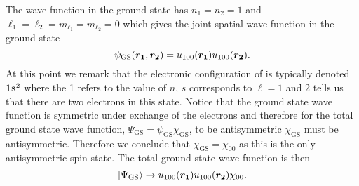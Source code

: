     The wave function in the ground state has \(n_1 = n_2 = 1\) and \(\ell_1 = \ell_2 = m_{\ell_1} = m_{\ell_2} = 0\) which gives the joint spatial wave function in the ground state
    \[\psi_{\mathrm{GS}}(\bm{r_1}, \bm{r_2}) = u_{100}(\bm{r_1})u_{100}(\bm{r_2}).\]
    At this point we remark that the electronic configuration of  is typically denoted \(\termNotation[1]{}{\mathrm{s}}{}^2\) where the 1 refers to the value of \(n\), \(s\) corresponds to \(\ell = 1\) and \(2\) tells us that there are two electrons in this state.
    Notice that the ground state wave function is symmetric under exchange of the electrons and therefore for the total ground state wave function, \(\Psi_{\mathrm{GS}} = \psi_{\mathrm{GS}}\chi_{\mathrm{GS}}\), to be antisymmetric \(\chi_{\mathrm{GS}}\) must be antisymmetric.
    Therefore we conclude that \(\chi_{\mathrm{GS}} = \chi_{00}\) as this is the only antisymmetric spin state.
    The total ground state wave function is then
    \[\vert {\Psi_{\mathrm{GS}}} \rangle \mathrel{\rightarrow} u_{100}(\bm{r_1})u_{100}(\bm{r_2})\chi_{00}.\]
    
